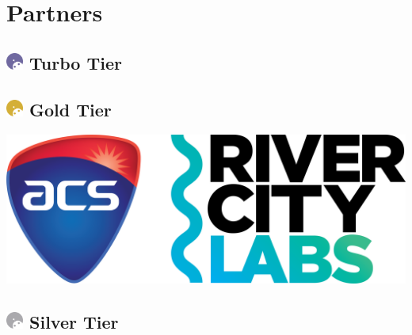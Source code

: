 \chapter{Partners}
\section{
    \includegraphics[width=1em]{../Assets/Partner Tier Icons/Turbo.png}
    \textcolor{turbo_purple}{Turbo Tier}
}
\begin{multicols}{2}
\end{multicols}

\section{
    \includegraphics[width=1em]{../Assets/Partner Tier Icons/Gold.png}
    \textcolor{partner_gold}{Gold Tier}
}
\begin{multicols}{2}
    \includegraphics[width=0.9\linewidth]{partner-logos/ACS-RCL_Logo-Colour.png}
\end{multicols}

\section{
    \includegraphics[width=1em]{../Assets/Partner Tier Icons/Silver.png}
    \textcolor{partner_silver}{Silver Tier}
}
\begin{multicols}{2}
\end{multicols}